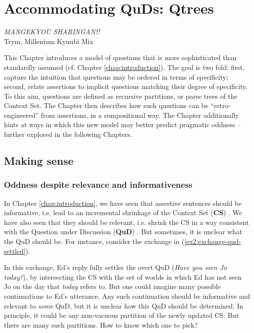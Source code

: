 \chapter{Accommodating QuDs: Qtrees}\label{chap:accommodating-quds}

\begin{flushright}
	\textit{MANGEKYOU SHARINGAN!!}\\\vspace{2mm}
	Trym, Millenium Kyuubi Mix
\end{flushright}

This Chapter introduces a model of questions that is more sophisticated than standardly assumed (cf. Chapter \ref{chap:introduction}). The goal is two fold: first, capture the intuition that questions may be ordered in terms of specificity; second, relate assertions to implicit questions matching their degree of specificity. To this aim, questions are defined as recursive partitions, or parse trees of the Context Set. The Chapter then describes how such questions can be ``retro-engineered'' from assertions, in a compositional way. The Chapter additionally hints at ways in which this new model may better predict pragmatic oddness -- further explored in the following Chapters.


\section{Making sense}

\subsection{Oddness despite relevance and informativeness}
In Chapter \ref{chap:introduction}, we have seen that assertive sentences should be informative, i.e. lead to an incremental shrinkage of the Context Set (\textbf{CS}) \parencite{Stalnaker1978,Heim1982}. We have also seen that they should be relevant, i.e. shrink the CS in a way consistent with the Question under Discussion (\textbf{QuD}) \parencite{Lewis1988,Roberts2012}. But sometimes, it is unclear what the QuD should be. For instance, consider the exchange in (\ref{ex2:exchange-qud-settled}).

\begin{exe}
	\label{ex2:exchange-qud-settled}
\end{exe}

In this exchange, Ed's reply fully settles the overt QuD (\textit{Have you seen Jo today?}), by intersecting the CS with the set of worlds in which Ed has not seen Jo on the day that \textit{today} refers to. But one could imagine many possible continuations to Ed's utterance. Any such continuation should be informative and relevant to \textit{some} QuD, but it is unclear how this QuD should be determined. In principle, it could be any non-vacuous partition of the newly updated CS. But there are many such partitions. How to know which one to pick?

